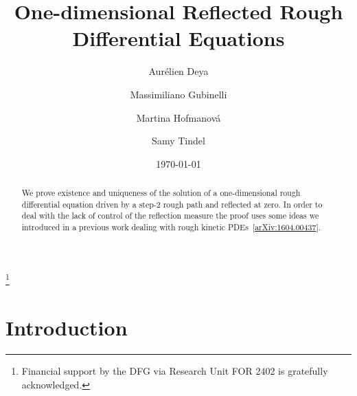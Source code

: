 \documentclass[11pt,reqno,oneside]{amsart}
\numberwithin{equation}{section}
\begin{document}
\title{
  One-dimensional Reflected Rough Differential Equations
}


\author{Aur\'elien Deya}
\address[A. Deya]{Institut Elie Cartan, University of Lorraine
B.P. 239, 54506 Vandoeuvre-l\`es-Nancy, Cedex
France}

\author{Massimiliano Gubinelli}
\address[M. Gubinelli]{Hausdorff Center for Mathematics \& Institute for Applied Mathematics, University of Bonn,
Endenicher Allee 60,
53115 Bonn, Germany}

\author{Martina Hofmanov\'a}
\address[M. Hofmanov\'a]{Institute of Mathematics,  Technical University Berlin, Stra\ss e des 17. Juni 136, 10623 Berlin, Germany}

\author{Samy Tindel}
\address[S. Tindel]{Department of Mathematics, Purdue University,
150 N. University Street,  West Lafayette, IN 47907, United States}

\thanks{Financial support by the DFG via Research Unit FOR 2402 is gratefully acknowledged.}
\date{\today}


\begin{abstract}
We prove existence and uniqueness of the solution of a one-dimensional rough differential equation
  driven by a step-2 rough path and reflected at zero. In order to deal with the lack of control of the reflection measure the proof uses some ideas we introduced in a previous work dealing with rough kinetic PDEs~[\href{https://arxiv.org/abs/1604.00437}{arXiv:1604.00437}].
\end{abstract}

\maketitle




\section{Introduction}
\end{document}
